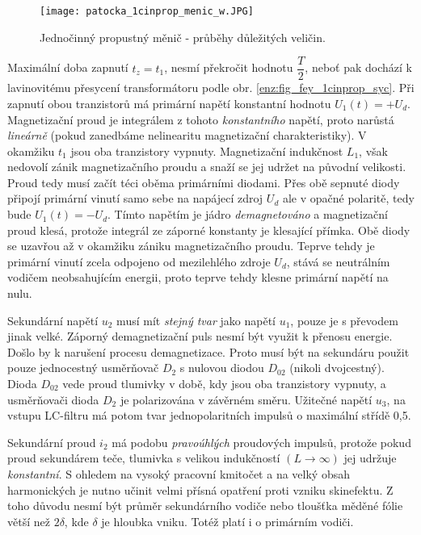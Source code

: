     \begin{figure}[ht!]
      \centering
      \texttt{[image: patocka\_1cinprop\_menic\_w.JPG]}
      \caption{Jednočinný propustný měnič - průběhy důležitých veličin.}
      \label{enz:fig_fey_1cinprop_mw} 
    \end{figure}
    
    Maximální doba zapnutí \(t_z=t_1\), nesmí překročit hodnotu \(\dfrac{T}{2}\), neboť pak 
    dochází k lavinovitému přesycení transformátoru podle obr. \ref{enz:fig_fey_1cinprop_syc}. 
    Při zapnutí obou tranzistorů má primární napětí konstantní hodnotu \(U_1(t)=+U_d\). 
    Magnetizační proud je integrálem z tohoto \emph{konstantního} napětí, proto narůstá 
    \emph{lineárně} (pokud zanedbáme nelinearitu magnetizační charakteristiky). V okamžiku 
    \(t_1\) jsou oba tranzistory vypnuty. Magnetizační indukčnost \(L_1\), však nedovolí zánik 
    magnetizačního proudu a snaží se jej udržet na původní velikosti. Proud tedy musí začít téci 
    oběma primárními diodami. Přes obě sepnuté diody připojí primární vinutí samo sebe na 
    napájecí zdroj \(U_d\) ale v opačné polaritě, tedy bude \(U_1(t)=-U_d\). Tímto napětím je 
    jádro \emph{demagnetováno} a magnetizační proud klesá, protože integrál ze záporné konstanty 
    je klesající přímka. Obě diody se uzavřou až v okamžiku zániku magnetizačního proudu. Teprve 
    tehdy je primární vinutí zcela odpojeno od mezilehlého zdroje \(U_d\), stává se neutrálním 
    vodičem neobsahujícím energii, proto teprve tehdy klesne primární napětí na nulu.
    
    Sekundární napětí \(u_2\) musí mít \emph{stejný tvar} jako napětí \(u_1\), pouze je s 
    převodem jinak velké. Záporný demagnetizační puls nesmí být využit k přenosu energie. Došlo 
    by k narušení procesu demagnetizace. Proto musí být na sekundáru použit pouze jednocestný 
    usměrňovač \(D_2\) s nulovou diodou \(D_{02}\) (nikoli dvojcestný). Dioda \(D_{02}\) vede 
    proud tlumivky v době, kdy jsou oba tranzistory vypnuty, a usměrňovači dioda \(D_2\) je 
    polarizována v závěrném směru. Užitečné napětí \(u_3\), na vstupu LC-filtru má potom tvar 
    jednopolaritních impulsů o maximální střídě 0,5.
    
    Sekundární proud \(i_2\) má podobu \emph{pravoúhlých} proudových impulsů, protože pokud proud 
    sekundárem teče, tlumivka s velikou indukčností \((L\rightarrow\infty)\) jej udržuje 
    \emph{konstantní}. S ohledem na vysoký pracovní kmitočet a na velký obsah harmonických je 
    nutno učinit velmi přísná opatření proti vzniku skinefektu. Z toho důvodu nesmí být průměr 
    sekundárního vodiče nebo tloušťka měděné fólie větší než \(2\delta\), kde \(\delta\) je 
    hloubka vniku. Totéž platí i o primárním vodiči.


